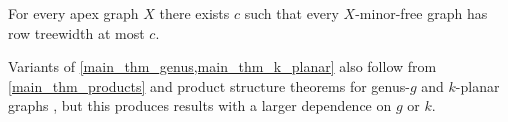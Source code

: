 \documentclass{patmorin}
\newcommand{\david}[1]{{\color{orange} David: #1}}
\newcommand{\pat}[1]{\textcolor{Blue}{Pat: #1}}
\newcommand{\defin}[1]{\emph{\textcolor{brightmaroon}{#1}}}
\begin{document}
\begin{thm}\label{apexmf_product_structure}
  For every apex graph $X$ there exists $c$ such that every $X$-minor-free graph has row treewidth at most $c$.
\end{thm}

Variants of \cref{main_thm_genus,main_thm_k_planar} also follow from \cref{main_thm_products} and product structure theorems for genus-$g$ and $k$-planar graphs \cite{dujmovic.joret.ea:planar,distel.hickingbotham.ea:improved,dujmovic.morin.ea:graph,distel.hickingbotham.ea:powers}, but this produces results with a larger dependence on $g$ or $k$.


%
%
%
\end{document}
